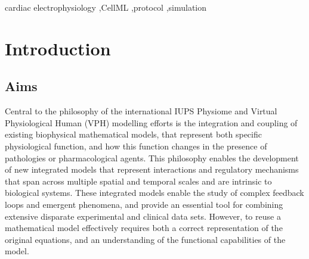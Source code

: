 \documentclass[preprint,authoryear,12pt]{elsarticle}
\begin{document}
\begin{frontmatter}
\begin{keyword}
cardiac electrophysiology \sep CellML \sep protocol \sep simulation
\end{keyword}


\end{frontmatter}


\section{Introduction}
\label{sec:intro}

\subsection{Aims}
\label{sec:intro-aims}

Central to the philosophy of the international IUPS Physiome and Virtual Physiological Human (VPH) modelling efforts \citep{Bassingthwaighte.00:Strategies,Cooper*.10:Virtual} is the integration and coupling of existing biophysical mathematical models, that represent both specific physiological function, and how this function changes in the presence of pathologies or pharmacological agents.
This philosophy enables the development of new integrated models that represent interactions and regulatory mechanisms that span across multiple spatial and temporal scales and are intrinsic to biological systems.
These integrated models enable the study of complex feedback loops and emergent phenomena, and provide an essential tool for combining extensive disparate experimental and clinical data sets.
However, to reuse a mathematical model effectively requires both a correct representation of the original equations, and an understanding of the functional capabilities of the model.
\end{document}
